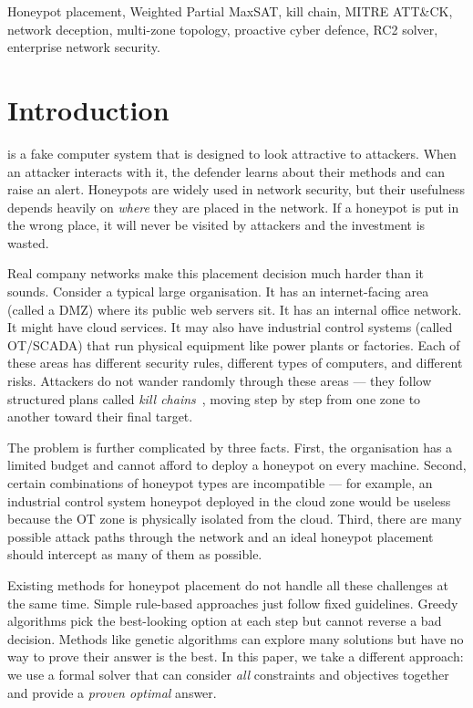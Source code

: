 \documentclass[journal]{IEEEtran}
\begin{document}
\begin{IEEEkeywords}
Honeypot placement, Weighted Partial MaxSAT, kill chain,
MITRE ATT\&CK, network deception, multi-zone topology,
proactive cyber defence, RC2 solver, enterprise network security.
\end{IEEEkeywords}

\section{Introduction}
\label{sec:intro}

 is a fake computer system that is
designed to look attractive to attackers. When an attacker interacts
with it, the defender learns about their methods and can raise an
alert. Honeypots are widely used in network security, but their
usefulness depends heavily on \emph{where} they are placed in the
network. If a honeypot is put in the wrong place, it will never be
visited by attackers and the investment is wasted.

Real company networks make this placement decision much harder than
it sounds. Consider a typical large organisation. It has an
internet-facing area (called a DMZ) where its public web servers
sit. It has an internal office network. It might have cloud
services. It may also have industrial control systems (called
OT/SCADA) that run physical equipment like power plants or
factories. Each of these areas has different security rules,
different types of computers, and different risks. Attackers do not
wander randomly through these areas --- they follow structured
plans called \emph{kill chains}~\cite{hutchins2011intelligence},
moving step by step from one zone to another toward their final
target.

The problem is further complicated by three facts. First, the
organisation has a limited budget and cannot afford to deploy a
honeypot on every machine. Second, certain combinations of honeypot
types are incompatible --- for example, an industrial control system
honeypot deployed in the cloud zone would be useless because the
OT zone is physically isolated from the cloud. Third, there are
many possible attack paths through the network and an ideal
honeypot placement should intercept as many of them as possible.

Existing methods for honeypot placement do not handle all these
challenges at the same time. Simple rule-based approaches just
follow fixed guidelines. Greedy algorithms pick the best-looking
option at each step but cannot reverse a bad decision. Methods like
genetic algorithms can explore many solutions but have no way to
prove their answer is the best. In this paper, we take a different
approach: we use a formal solver that can consider \emph{all}
constraints and objectives together and provide a \emph{proven
optimal} answer.
\end{document}
